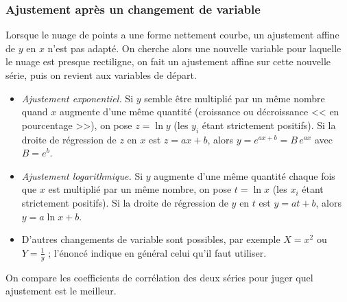                   \subsubsection{Ajustement apr\`es un changement de variable}
                        Lorsque le nuage de points a une forme nettement courbe, un ajustement affine de $y$ en $x$ 
                        n'est pas adapt\'e. On cherche alors une nouvelle variable pour laquelle le nuage est presque rectiligne,
                        on fait un ajustement affine sur cette nouvelle s\'erie, puis on revient aux variables de d\'epart.
                        \begin{itemize}
                              \item \emph{Ajustement exponentiel.} Si $y$ semble \^etre multipli\'e par un m\^eme nombre 
                                    quand $x$ augmente d'une m\^eme quantit\'e (croissance ou d\'ecroissance << en pourcentage >>),
                                    on pose $z = \ln y$ (les $y_i$ \'etant strictement positifs). Si la droite de r\'egression 
                                    de $z$ en $x$ est $z = a x + b$, alors $y = e^{ax + b} = B\, e^{ax}$ avec $B = e^{b}$.
                              \item \emph{Ajustement logarithmique.} Si $y$ augmente d'une m\^eme quantit\'e chaque fois que 
                                    $x$ est multipli\'e par un m\^eme nombre, on pose $t = \ln x$ (les $x_i$ \'etant strictement positifs).
                                    Si la droite de r\'egression de $y$ en $t$ est $y = a t + b$, alors $y = a \ln x + b$.
                              \item D'autres changements de variable sont possibles, par exemple $X = x^2$ ou $Y = \frac{1}{y}$ ;
                                    l'\'enonc\'e indique en g\'en\'eral celui qu'il faut utiliser.
                        \end{itemize}
                        On compare les coefficients de corr\'elation des deux s\'eries pour juger quel ajustement est le meilleur.
